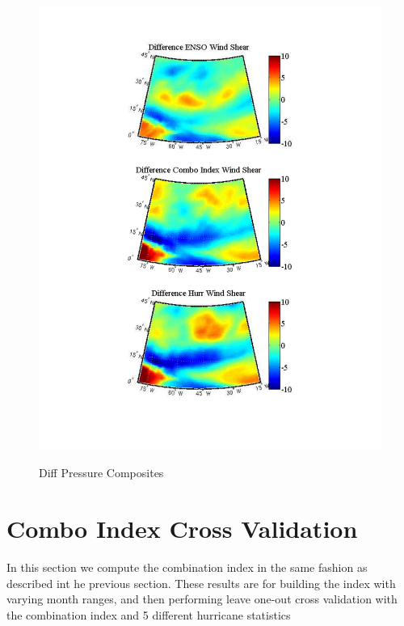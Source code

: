 \documentclass[]{article}
\begin{document}
\begin{figure}[ht]
\begin{minipage}[b]{0.55\linewidth}
\includegraphics[width=\textwidth]{figures/comboIndex/composites/compareMDRCompositesWindShear.pdf}
\caption{Diff Pressure Composites}
\label{fig:figure36}
\end{minipage}
\hspace{0cm}
\begin{minipage}[b]{0.55\linewidth}
\label{fig:figure37}
\end{minipage}
\end{figure}
\clearpage
\section{Combo Index Cross Validation}
In this section we compute the combination index in the same fashion as described int he previous section.  These results are for building the index with varying month ranges, and then performing leave one-out cross validation with the combination index and 5 different hurricane statistics 
\end{document}
